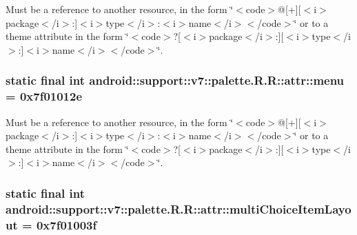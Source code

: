 Must be a reference to another resource, in the form \char`\"{}$<$code$>$@\mbox{[}+\mbox{]}\mbox{[}$<$i$>$package$<$/i$>$:\mbox{]}$<$i$>$type$<$/i$>$:$<$i$>$name$<$/i$>$$<$/code$>$\char`\"{} or to a theme attribute in the form \char`\"{}$<$code$>$?\mbox{[}$<$i$>$package$<$/i$>$:\mbox{]}\mbox{[}$<$i$>$type$<$/i$>$:\mbox{]}$<$i$>$name$<$/i$>$$<$/code$>$\char`\"{}. \hypertarget{classandroid_1_1support_1_1v7_1_1palette_1_1_r_1_1attr_688b6779090f34e9f6965580ecb7ea16}{
\subsubsection[{menu}]{\setlength{\rightskip}{0pt plus 5cm}static final int android::support::v7::palette.R.R::attr::menu = 0x7f01012e}}
\label{classandroid_1_1support_1_1v7_1_1palette_1_1_r_1_1attr_688b6779090f34e9f6965580ecb7ea16}


Must be a reference to another resource, in the form \char`\"{}$<$code$>$@\mbox{[}+\mbox{]}\mbox{[}$<$i$>$package$<$/i$>$:\mbox{]}$<$i$>$type$<$/i$>$:$<$i$>$name$<$/i$>$$<$/code$>$\char`\"{} or to a theme attribute in the form \char`\"{}$<$code$>$?\mbox{[}$<$i$>$package$<$/i$>$:\mbox{]}\mbox{[}$<$i$>$type$<$/i$>$:\mbox{]}$<$i$>$name$<$/i$>$$<$/code$>$\char`\"{}. \hypertarget{classandroid_1_1support_1_1v7_1_1palette_1_1_r_1_1attr_5265c4e62f187e4d6115e42259ad5036}{
\subsubsection[{multiChoiceItemLayout}]{\setlength{\rightskip}{0pt plus 5cm}static final int android::support::v7::palette.R.R::attr::multiChoiceItemLayout = 0x7f01003f}}
\label{classandroid_1_1support_1_1v7_1_1palette_1_1_r_1_1attr_5265c4e62f187e4d6115e42259ad5036}


